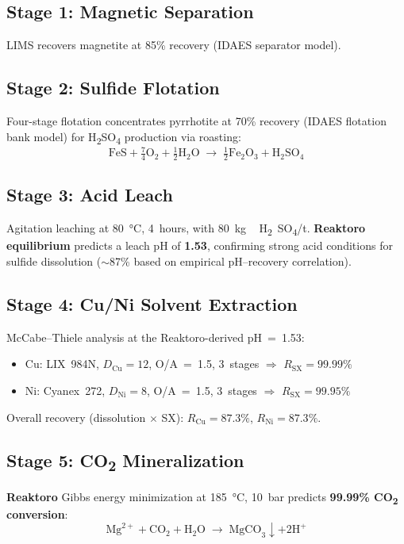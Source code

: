 \documentclass[11pt,a4paper]{article}
\begin{document}
\subsection{Stage 1: Magnetic Separation}
LIMS recovers magnetite at 85\% recovery (IDAES separator model).

\subsection{Stage 2: Sulfide Flotation}
Four-stage flotation concentrates pyrrhotite at 70\% recovery (IDAES
flotation bank model) for H\textsubscript{2}SO\textsubscript{4}
production via roasting:
\begin{equation}
  \text{FeS} + \tfrac{7}{4}\text{O}_2 + \tfrac{1}{2}\text{H}_2\text{O}
  \;\longrightarrow\;
  \tfrac{1}{2}\text{Fe}_2\text{O}_3 + \text{H}_2\text{SO}_4
\end{equation}

\subsection{Stage 3: Acid Leach}
Agitation leaching at \SI{80}{\celsius}, 4~hours, with
\SI{80}{kg\,H_2SO_4/t}.  \textbf{Reaktoro equilibrium} predicts a leach
pH of \textbf{1.53}, confirming strong acid conditions for sulfide
dissolution ($\sim$87\% based on empirical pH--recovery correlation).

\subsection{Stage 4: Cu/Ni Solvent Extraction}
McCabe--Thiele analysis at the Reaktoro-derived pH~=~1.53:
\begin{itemize}
  \item Cu: LIX~984N, $D_\text{Cu}=12$, O/A~=~1.5, 3~stages
        $\Rightarrow$ $R_\text{SX}=99.99\%$
  \item Ni: Cyanex~272, $D_\text{Ni}=8$, O/A~=~1.5, 3~stages
        $\Rightarrow$ $R_\text{SX}=99.95\%$
\end{itemize}
Overall recovery (dissolution $\times$ SX):
$R_\text{Cu}=87.3\%$, $R_\text{Ni}=87.3\%$.

\subsection{Stage 5: CO\textsubscript{2} Mineralization}
\textbf{Reaktoro} Gibbs energy minimization at \SI{185}{\celsius},
\SI{10}{bar} predicts \textbf{99.99\% CO\textsubscript{2} conversion}:
\begin{equation}
  \text{Mg}^{2+} + \text{CO}_2 + \text{H}_2\text{O}
  \;\longrightarrow\;
  \text{MgCO}_3 \downarrow + 2\text{H}^+
\end{equation}
\end{document}
